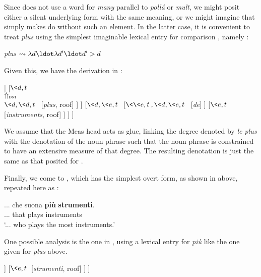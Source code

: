 \documentclass[output=paper
,modfonts
,nonflat]{langsci/langscibook}
\begin{document}
Since  does not use a word for \textit{many} parallel to  \textit{poll\'a} or  \textit{mult}, we might posit either a silent underlying form with the same meaning, or we might imagine that  simply makes do without such an element. In the latter case, it is convenient to treat \textit{plus} using the simplest imaginable lexical entry for comparison \citep{Heim2006,Beck2010}, namely :

\ea \label{ex:coppockstrand:103}
\textit{plus} $\leadsto \lambda d \ldot \lambda d' \ldot d' > d$
\z 

Given this, we have the derivation in :

\ea \label{ex:coppockstrand:104} 
\begin{forest}
	[{$\<e,t\>$}
		[{$d$}
			[{$\<\<\tau,t\>,\tau\>$} [\textit{le}]
			]
			[{$\<d,t\>$\\$\Uparrow_{\textsc{dni}}$\\$\<d,\<d,t\>\>$} [\textit{plus}, roof]
			]
		]
		[{$\<d,\<e,t\>\>$}
			[{$\<\<e,t\>,\<d,\<e,t\>\>$} [\textit{de}]
			]
			[{$\<e,t\>$} [\textit{instruments}, roof]
			]
		]
	]
\end{forest}
\z 

We assume that the Meas head acts as glue, linking the degree denoted by \textit{le plus} with the denotation of the noun phrase such that the noun phrase is constrained to have an extensive measure of that degree. The resulting denotation is just the same as that posited for .

Finally, we come to , which has the simplest overt form, as shown in  above, repeated here as :

\ea \label{ex:coppockstrand:105}
\gll ... che suona \textbf{più} \textbf{strumenti}.\\
... that plays \cmpr{} instruments\\ 
\glt `...  who plays the most instruments.'
\z 

One possible analysis is the one in , using a lexical entry for \textit{pi\`u} like the one given for  \textit{plus} above.

\ea \label{ex:coppockstrand:106}
\begin{forest}
	[{$\<e,t\>$\\(by Measure Identification)}
		[{$\<d,t\>$\\$\Uparrow_{\textsc{dni}}$\\$\<d,dt\>$} [\textit{pi\`u}, roof]
		]
		[{$\<e,t\>$} [\textit{strumenti}, roof]
		]
	]
\end{forest}
\z 
\end{document}
